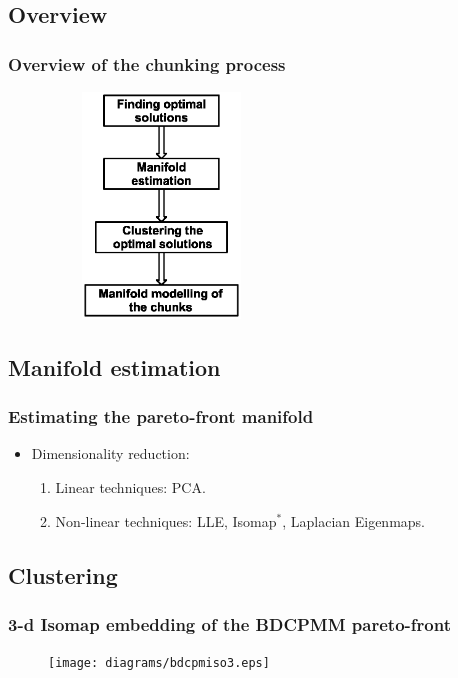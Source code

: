 \documentclass[svgnames, table, smaller]{beamer}
\begin{document}
\subsection{Overview}

\begin{frame}
  \frametitle{Overview of the chunking process}
  \begin{figure}[ht]\begin{center}
      \includegraphics[width=60mm, height=60mm]{dia/overview.eps}
      \label{overview}
    \end{center}\end{figure}
\end{frame}



\subsection{Manifold estimation}

\begin{frame}
  \frametitle{Estimating the pareto-front manifold}
  
  \begin{itemize}
  \item Dimensionality reduction:
    \begin{enumerate}
    \item Linear techniques: PCA.
    \item Non-linear techniques: LLE, Isomap$^*$, Laplacian Eigenmaps.
    \end{enumerate}
  \end{itemize}
\end{frame}


\subsection{Clustering}


\begin{frame}
  \frametitle{3-d Isomap embedding of the BDCPMM pareto-front}

  \begin{figure}[ht]
    \begin{center}
      \texttt{[image: diagrams/bdcpmiso3.eps]} 
      \label{bdcpmiso3}
    \end{center}
  \end{figure}


\end{frame}
\end{document}
